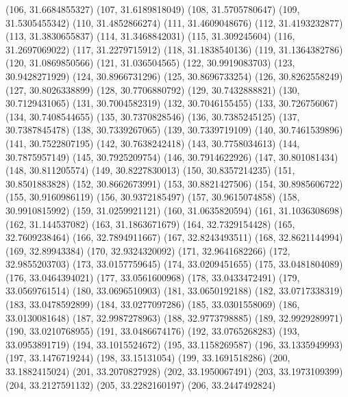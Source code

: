 {					(106, 31.6684855327)
					(107, 31.6189818049)
					(108, 31.5705780647)
					(109, 31.5305455342)
					(110, 31.4852866274)
					(111, 31.4609048676)
					(112, 31.4193232877)
					(113, 31.3830655837)
					(114, 31.3468842031)
					(115, 31.309245604)
					(116, 31.2697069022)
					(117, 31.2279715912)
					(118, 31.1838540136)
					(119, 31.1364382786)
					(120, 31.0869850566)
					(121, 31.036504565)
					(122, 30.9919083703)
					(123, 30.9428271929)
					(124, 30.8966731296)
					(125, 30.8696733254)
					(126, 30.8262558249)
					(127, 30.8026338899)
					(128, 30.7706880792)
					(129, 30.7432888821)
					(130, 30.7129431065)
					(131, 30.7004582319)
					(132, 30.7046155455)
					(133, 30.726756067)
					(134, 30.7408544655)
					(135, 30.7370828546)
					(136, 30.7385245125)
					(137, 30.7387845478)
					(138, 30.7339267065)
					(139, 30.7339719109)
					(140, 30.7461539896)
					(141, 30.7522807195)
					(142, 30.7638242418)
					(143, 30.7758034613)
					(144, 30.7875957149)
					(145, 30.7925209754)
					(146, 30.7914622926)
					(147, 30.801081434)
					(148, 30.811205574)
					(149, 30.8227830013)
					(150, 30.8357214235)
					(151, 30.8501883828)
					(152, 30.8662673991)
					(153, 30.8821427506)
					(154, 30.8985606722)
					(155, 30.9160986119)
					(156, 30.9372185497)
					(157, 30.9615074858)
					(158, 30.9910815992)
					(159, 31.0259921121)
					(160, 31.0635820594)
					(161, 31.1036308698)
					(162, 31.144537082)
					(163, 31.1863671679)
					(164, 32.7329154428)
					(165, 32.7609238464)
					(166, 32.7894911667)
					(167, 32.8243493511)
					(168, 32.8621144994)
					(169, 32.89943384)
					(170, 32.9324320092)
					(171, 32.9641682266)
					(172, 32.9855203703)
					(173, 33.0157759645)
					(174, 33.0209451655)
					(175, 33.0481804089)
					(176, 33.0464394021)
					(177, 33.0561600968)
					(178, 33.0433472491)
					(179, 33.0569761514)
					(180, 33.0696510903)
					(181, 33.0650192188)
					(182, 33.0717338319)
					(183, 33.0478592899)
					(184, 33.0277097286)
					(185, 33.0301558069)
					(186, 33.0130081648)
					(187, 32.9987278963)
					(188, 32.9773798885)
					(189, 32.9929289971)
					(190, 33.0210768955)
					(191, 33.0486674176)
					(192, 33.0765268283)
					(193, 33.0953891719)
					(194, 33.1015524672)
					(195, 33.1158269587)
					(196, 33.1335949993)
					(197, 33.1476719244)
					(198, 33.15131054)
					(199, 33.1691518286)
					(200, 33.1882415024)
					(201, 33.2070827928)
					(202, 33.1950067491)
					(203, 33.1973109399)
					(204, 33.2127591132)
					(205, 33.2282160197)
					(206, 33.2447492824)
}
